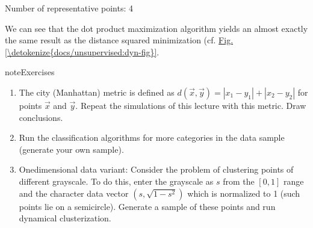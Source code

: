 \documentclass[letterpaper,10pt,english]{jupyterBook}
\begin{document}
\begin{sphinxVerbatim}[commandchars=\\\{\}]
         \PYG{p}{[}\PYG{p}{]}    
              \PYG{p}{[}\PYG{p}{]} 
            \PYG{p}{[}\PYG{p}{]}\PYG{p}{[}\PYG{p}{]}

\end{sphinxVerbatim}

\begin{sphinxVerbatim}[commandchars=\\\{\}]
Number of representative points:  4
\end{sphinxVerbatim}

\noindent{}

\sphinxAtStartPar
We can see that the dot product maximization algorithm yields an almost exactly the same result as the distance squared minimization (cf. \hyperref[\detokenize{docs/unsupervised:dyn-fig}]{Fig.\@ \ref{\detokenize{docs/unsupervised:dyn-fig}}}.

\begin{sphinxadmonition}{note}{Exercises}
\begin{enumerate}
%
\item {} 
\sphinxAtStartPar
The city (Manhattan) metric is defined as
\( d (\vec {x}, \vec {y}) = | x_1-y_1 | + | x_2 - y_2 | \) for points \( \vec {x} \) and \( \vec {y} \).
Repeat the simulations of this lecture with this metric. Draw conclusions.

\item {} 
\sphinxAtStartPar
Run the classification algorithms for more categories in the data sample (generate your own sample).

\item {} 
\sphinxAtStartPar
One\sphinxhyphen{}dimensional data variant: Consider the problem of clustering points of different grayscale. To do this, enter the grayscale as \( s \) from the \( [0,1] \) range and the character data vector
\( (s, \sqrt {1-s ^ 2}) \) which is normalized to 1 (such points lie on a semicircle). Generate a sample of these points and run dynamical clusterization.

\end{enumerate}
\end{sphinxadmonition}
\end{document}
